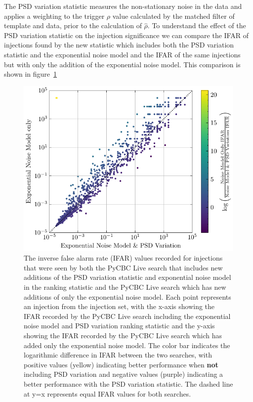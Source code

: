 The PSD variation statistic measures the non-stationary noise in the data and applies a weighting to the trigger $\rho$ value calculated by the matched filter of template and data, prior to the calculation of $\hat{\rho}$. To understand the effect of the PSD variation statistic on the injection significance we can compare the IFAR of injections found by the new statistic which includes both the PSD variation statistic and the exponential noise model and the IFAR of the same injections but with only the addition of the exponential noise model. This comparison is shown in figure~\ref{5:fig:ifar-ifar-fits-vs-fits-psdvar}
%
\begin{figure}
       \centering
    \includegraphics[width=1\textwidth]{images/5_pycbclive/fits-only/fits_only_fits_psd_var_ifar_vs_ifar.pdf}
    \caption{The inverse false alarm rate (IFAR) values recorded for injections that were seen by both the PyCBC Live search that includes new additions of the PSD variation statistic and exponential noise model in the ranking statistic and the PyCBC Live search which has new additions of only the exponential noise model. Each point represents an injection from the injection set, with the x-axis showing the IFAR recorded by the PyCBC Live search including the exponential noise model and PSD variation ranking statistic and the y-axis showing the IFAR recorded by the PyCBC Live search which has added only the exponential noise model. The color bar indicates the logarithmic difference in IFAR between the two searches, with positive values (yellow) indicating better performance when \textbf{not} including PSD variation and negative values (purple) indicating a better performance with the PSD variation statistic. The dashed line at y=x represents equal IFAR values for both searches.}
    \label{5:fig:ifar-ifar-fits-vs-fits-psdvar}
\end{figure}
